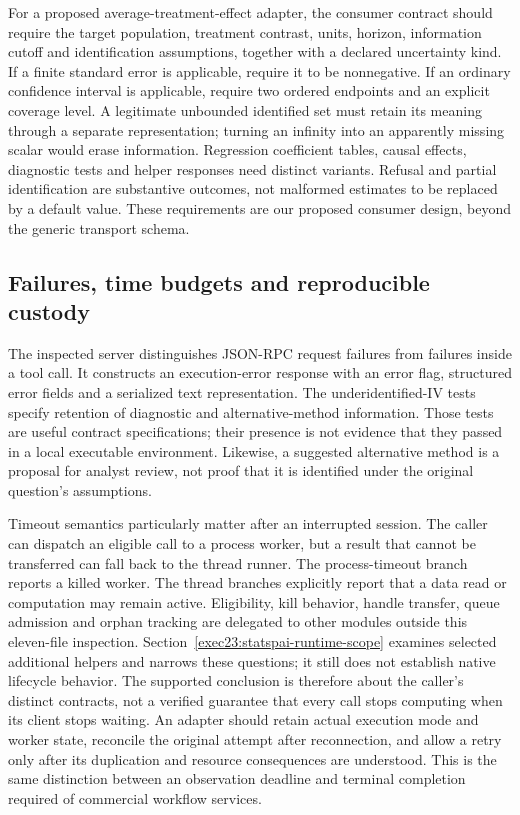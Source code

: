 For a proposed average-treatment-effect adapter, the consumer contract should
require the target population, treatment contrast, units, horizon, information
cutoff and identification assumptions, together with a declared uncertainty
kind. If a finite standard error is applicable, require it to be nonnegative.
If an ordinary confidence interval is applicable, require two ordered endpoints
and an explicit coverage level. A legitimate unbounded identified set must
retain its meaning through a separate representation; turning an infinity into
an apparently missing scalar would erase information. Regression coefficient
tables, causal effects, diagnostic tests and helper responses need distinct
variants. Refusal and partial identification are substantive outcomes, not
malformed estimates to be replaced by a default value. These requirements are
our proposed consumer design, beyond the generic transport schema.

\subsection{Failures, time budgets and reproducible custody}
\label{exec23:statspai-contract-runtime}
The inspected server distinguishes JSON-RPC request failures from failures
inside a tool call. It constructs an execution-error response with an error
flag, structured error fields and a serialized text representation. The
underidentified-IV tests specify retention of diagnostic and alternative-method
information. Those tests are useful contract specifications; their presence
is not evidence that they passed in a local executable environment. Likewise,
a suggested alternative method is a proposal for analyst review, not proof
that it is identified under the original question's assumptions.
\citep{exec23_statspai_contract}

Timeout semantics particularly matter after an interrupted session. The caller
can dispatch an eligible call to a process worker, but a result that cannot be
transferred can fall back to the thread runner. The process-timeout branch
reports a killed worker. The thread branches explicitly report that a data read
or computation may remain active. Eligibility, kill behavior, handle transfer,
queue admission and orphan tracking are delegated to other modules outside this eleven-file inspection. Section~\ref{exec23:statspai-runtime-scope} examines selected additional helpers and narrows these questions; it still does not establish native lifecycle behavior. The supported conclusion is therefore
about the caller's distinct contracts, not a verified guarantee that every
call stops computing when its client stops waiting. An adapter should retain
actual execution mode and worker state, reconcile the original attempt after
reconnection, and allow a retry only after its duplication and resource
consequences are understood. This is the same distinction between an
observation deadline and terminal completion required of commercial workflow
services.
\citep{exec23_statspai_contract}

